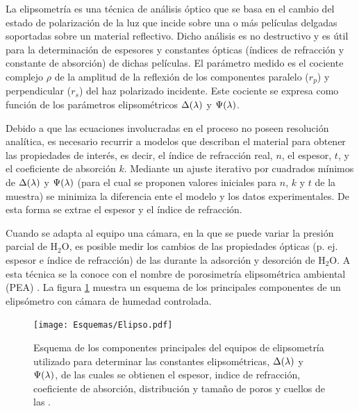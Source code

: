 		La elipsometría es una técnica de análisis óptico que se basa en el cambio del estado de polarización de la luz que incide sobre una o más películas delgadas soportadas sobre un material reflectivo. Dicho análisis es no destructivo y es útil para la determinación de espesores y constantes ópticas (índices de refracción y constante de absorción) de dichas películas.\cite{TompkinsHarlandG.1999,Rothen1945} El parámetro medido es el cociente complejo $\rho$ de la amplitud de la reflexión de los componentes paralelo ($r_p$) y perpendicular ($r_s$) del haz polarizado incidente. Este cociente se expresa como función de los parámetros elipsométricos $\Delta(\lambda\index{longitud de onda})$ y $\Psi(\lambda\index{longitud de onda})$. 

		Debido a que las ecuaciones involucradas en el proceso no poseen resolución analítica, es necesario recurrir a modelos que describan el material para obtener las propiedades de interés, es decir, el índice de refracción real, $n$, el espesor, $t$, y el coeficiente de absorción $k$. Mediante un ajuste iterativo por cuadrados mínimos de $\Delta(\lambda\index{longitud de onda})$ y $\Psi(\lambda\index{longitud de onda})$ (para el cual se proponen valores iniciales para $n$, $k$ y $t$ de la muestra) se minimiza la diferencia ente el modelo y los datos experimentales. De esta forma se extrae el espesor y el índice de refracción. \cite{TompkinsHarlandG.1999}

		Cuando se adapta al equipo una cámara, en la que se puede variar la presión parcial de H$_2$O, es posible medir los cambios de las propiedades ópticas (p. ej. espesor e índice de refracción) de las \pdm\space durante la adsorción y desorción de H$_2$O. A esta técnica se la conoce con el nombre de porosimetría elipsométrica ambiental (PEA) \cite{Boissiere2005}. La figura \ref{fig:elipso} muestra un esquema de los principales componentes de un elipsómetro con cámara de humedad controlada.

			  \begin{figure}[h]
				\begin{center}
				\texttt{[image: Esquemas/Elipso.pdf]}
			  	\caption[Esquema de la técncia de elipsoporosimetría ambiental]{Esquema de los componentes principales del equipos de elipsometría utilizado para determinar las constantes elipsométricas, $\Delta(\lambda\index{longitud de onda})$ y $\Psi(\lambda\index{longitud de onda})$, de las cuales se obtienen el espesor, indice de refracción, coeficiente de absorción,  distribución y tamaño de poros y cuellos de las \pdm.}
			  	\label{fig:elipso}
			  	\end{center}
			  	\end{figure}
		
